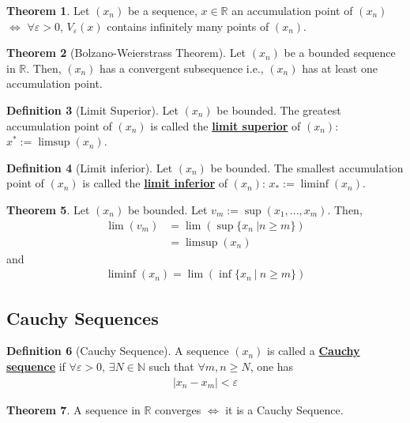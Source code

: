 \documentclass[reqno,11pt]{amsart}
\theoremstyle{definition}
\newtheorem{theorem}{Theorem}
\theoremstyle{definition}
\newtheorem{definition}[theorem]{Definition}
\theoremstyle{remark}
\newcommand{\R}{\mathbb{R}}
\newcommand{\N}{\mathbb{N}}
\newcommand{\eps}{\varepsilon}
\newcommand{\dfn}[1]{\underline{\textbf{#1}}}
\begin{document}
\begin{theorem}
	Let $(x_n)$ be a sequence, $x \in \R$ an accumulation point of $(x_n)$ $\iff$ $\forall \eps > 0$, $V_\eps(x)$ contains infinitely many points of $(x_n)$.
\end{theorem}

\begin{theorem}[Bolzano-Weierstrass Theorem]
	Let $(x_n)$ be a bounded sequence in $\R$. Then, $(x_n)$ has a convergent subsequence i.e., $(x_n)$ has at least one accumulation point.
\end{theorem}

\begin{definition}[Limit Superior]
	Let $(x_n)$ be bounded. The greatest accumulation point of $(x_n)$ is called the \dfn{limit superior} of $(x_n)$: $x^* := \limsup (x_n)$.
\end{definition}

\begin{definition}[Limit inferior] 
		Let $(x_n)$ be bounded. The smallest accumulation point of $(x_n)$ is called the \dfn{limit inferior} of $(x_n)$: $x_* := \liminf (x_n)$.
\end{definition}

\begin{theorem}
	Let $(x_n)$ be bounded. Let $v_m := \sup( x_1, ..., x_m)$. Then, 
	\begin{align*}
		\lim (v_m) 	& = \lim ( \sup \{ x_n\ | n \geq m \} ) \\
					& = \limsup(x_n) 
	\end{align*} 
	and 
	\begin{align*}
		\liminf(x_n) = \lim (\inf \{ x_n\ |\ n \geq m \} ) 
	\end{align*}
\end{theorem}


\subsection{Cauchy Sequences}

\begin{definition}[Cauchy Sequence]
	A sequence $(x_n)$ is called a \dfn{Cauchy sequence} if $\forall \eps > 0$, $\exists N \in \N$ such that $\forall m , n \geq N$, one has 
	\begin{align}
		|x_n - x_m| < \eps 	
	\end{align}
\end{definition}

\begin{theorem}
	A sequence in $\R$ converges $\iff$ it is a Cauchy Sequence.
\end{theorem}
\end{document}
